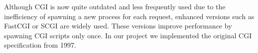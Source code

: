 Although CGI is now quite outdated and less frequently used due to the inefficiency of spawning a new process for each request, enhanced versions such as FastCGI or SCGI are widely used. These versions improve performance by spawning CGI scripts only once. In our project we implemented the original CGI specification from 1997.


